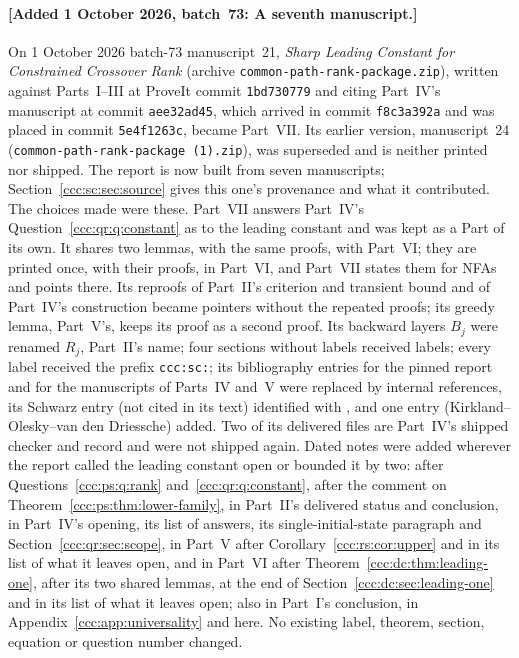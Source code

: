 \documentclass[11pt,letterpaper]{article}
\theoremstyle{definition}
\theoremstyle{remark}
\newcommand{\waddsevthree}[1]{\textup{[}Added 1 October 2026, batch~73: #1\textup{]}}
\begin{document}
\paragraph{\waddsevthree{A seventh manuscript.}} On 1 October 2026 batch-73
manuscript~21, \emph{Sharp Leading Constant for Constrained Crossover Rank}
(archive \texttt{common-path-rank-package.zip}), written against Parts~I--III
at ProveIt commit \texttt{1bd730779} and citing Part~IV's manuscript at
commit \texttt{aee32ad45}, which arrived in commit \texttt{f8c3a392a} and
was placed in commit \texttt{5e4f1263c}, became Part~VII. Its earlier
version, manuscript~24 (\texttt{common-path-rank-package~(1).zip}), was
superseded and is neither printed nor shipped. The report is now built from
seven manuscripts; Section~\ref{ccc:sc:sec:source} gives this one's
provenance and what it contributed. The choices made were these. Part~VII
answers Part~IV's Question~\ref{ccc:qr:q:constant} as to the leading constant
and was kept as a Part of its own. It shares two lemmas, with the same
proofs, with Part~VI; they are printed once, with their proofs, in Part~VI,
and Part~VII states them for NFAs and points there. Its reproofs of Part~II's
criterion and transient bound and of Part~IV's construction became pointers
without the repeated proofs; its greedy lemma, Part~V's, keeps its proof as a
second proof. Its backward layers $B_j$ were renamed $R_j$, Part~II's name;
four sections without labels received labels; every label received the
prefix \texttt{ccc:sc:}; its bibliography entries for the pinned report and
for the manuscripts of Parts~IV and~V were replaced by internal references,
its Schwarz entry (not cited in its text) identified with \cite{Schwarz}, and
one entry (Kirkland--Olesky--van den Driessche) added. Two of its delivered
files are Part~IV's shipped checker and record and were not shipped again.
Dated notes were added wherever the report called the leading constant open
or bounded it by two: after Questions~\ref{ccc:ps:q:rank}
and~\ref{ccc:qr:q:constant}, after the comment on
Theorem~\ref{ccc:ps:thm:lower-family}, in Part~II's delivered status and
conclusion, in Part~IV's opening, its list of answers, its single-initial-state
paragraph and Section~\ref{ccc:qr:sec:scope}, in Part~V after
Corollary~\ref{ccc:rs:cor:upper} and in its list of what it leaves open, and in
Part~VI after Theorem~\ref{ccc:dc:thm:leading-one}, after its two shared
lemmas, at the end of Section~\ref{ccc:dc:sec:leading-one} and in its list of
what it leaves open; also in Part~I's conclusion, in
Appendix~\ref{ccc:app:universality} and here. No existing label, theorem,
section, equation or question number changed.
\end{document}
